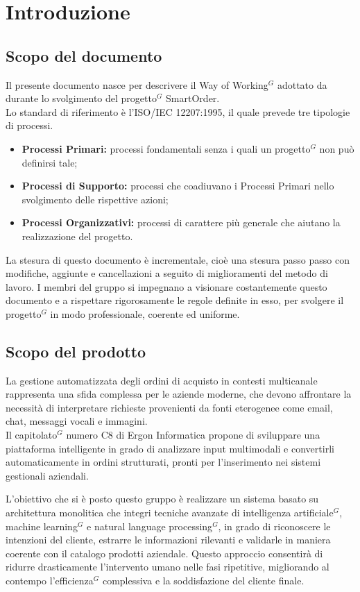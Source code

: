 \section{Introduzione}
	\subsection{Scopo del documento}
	Il presente documento nasce per descrivere il Way of Working$^G$ adottato da \textbf{} durante lo svolgimento del progetto$^G$ SmartOrder.\\
	Lo standard di riferimento è l'ISO/IEC 12207:1995, il quale prevede tre tipologie di processi.
	\begin{itemize}
	    \setlength\itemsep{-0.1em}
	    \item \textbf{Processi Primari:} processi fondamentali senza i quali un progetto$^G$ non può definirsi tale;
	    \item \textbf{Processi di Supporto:} processi che coadiuvano i Processi Primari nello svolgimento delle rispettive azioni;
	    \item \textbf{Processi Organizzativi:} processi di carattere più generale che aiutano la realizzazione del progetto.
	\end{itemize}

	La stesura di questo documento è incrementale, cioè una stesura passo passo con modifiche, aggiunte e cancellazioni a seguito di miglioramenti del metodo di lavoro. I membri del gruppo si impegnano a visionare costantemente questo documento e a rispettare rigorosamente le regole definite in esso, per svolgere il progetto$^G$ in modo professionale, coerente ed uniforme.

\subsection{Scopo del prodotto}
	La gestione automatizzata degli ordini di acquisto in contesti multicanale rappresenta una sfida complessa per le aziende moderne, che devono affrontare la necessità di interpretare richieste provenienti da fonti eterogenee come email, chat, messaggi vocali e immagini.\\
	Il capitolato$^G$ numero C8 di Ergon Informatica propone di sviluppare una piattaforma intelligente in grado di analizzare input multimodali e convertirli automaticamente in ordini strutturati, pronti per l'inserimento nei sistemi gestionali aziendali.

	L'obiettivo che si è posto questo gruppo è realizzare un sistema basato su architettura monolitica che integri tecniche avanzate di intelligenza artificiale$^G$, machine learning$^G$ e natural language processing$^G$, in grado di riconoscere le intenzioni del cliente, estrarre le informazioni rilevanti e validarle in maniera coerente con il catalogo prodotti aziendale. Questo approccio consentirà di ridurre drasticamente l'intervento umano nelle fasi ripetitive, migliorando al contempo l'efficienza$^G$ complessiva e la soddisfazione del cliente finale.

